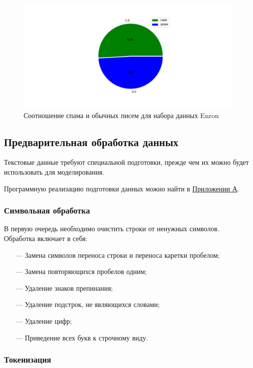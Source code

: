\begin{figure}[H]
    \centering
    \includegraphics[width=150mm]{static/enron.png}
    \caption{Соотношение спама и обычных писем для набора данных Enron}
    \label{EnronScheme}
\end{figure}


\subsection{Предварительная обработка данных}

Текстовые данные требуют специальной подготовки, прежде чем их можно будет использовать для
моделирования.

Программную реализацию подготовки данных можно найти в \hyperref[App1]{Приложении А}.

\subsubsection{Символьная обработка}

В первую очередь необходимо очистить строки от ненужных символов. Обработка включает в себя:

\begin{itemize}
    \item[—] Замена символов переноса строки и переноса каретки пробелом;
    \item[—] Замена повторяющихся пробелов одним;
    \item[—] Удаление знаков препинания;
    \item[—] Удаление подстрок, не являющихся словами;
    \item[—] Удаление цифр;
    \item[—] Приведение всех букв к строчному виду.
\end{itemize}

\subsubsection{Токенизация}

